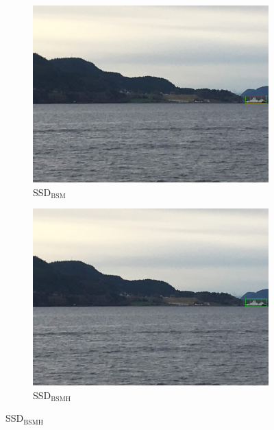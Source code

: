 \begin{figure}[h!]
\begin{subfigure}{.5\textwidth}
  \centering
  \includegraphics[width=0.8\linewidth]{results/case_buildings/ssdtrf/ssd2/2better/IMG_2273.jpg}
  \caption{SSD$_{\text{BSM}}$}
\end{subfigure}%
\begin{subfigure}{.5\textwidth}
  \centering
  \includegraphics[width=.8\linewidth]{results/case_buildings/ssdtrf/ssd3/2better/IMG_2273.jpg}
  \caption{SSD$_{\text{BSMH}}$}
\end{subfigure}


\end{figure}
